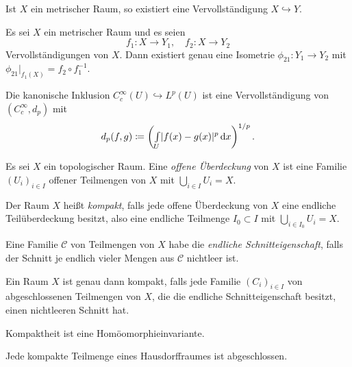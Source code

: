 \documentclass{cheat-sheet}
\begin{document}
\begin{satz}
  Ist $X$ ein metrischer Raum, so existiert eine Vervollständigung $X \hookrightarrow Y$.
\end{satz}

\begin{prop}
  Es sei $X$ ein metrischer Raum und es seien
  \[ f_1 : X \to Y_1, \quad f_2 : X \to Y_2 \]
  Vervollständigungen von $X$. Dann existiert genau eine Isometrie $\phi_{21} : Y_1 \to Y_2$ mit $\phi_{21}|_{f_1(X)} = f_2 \circ f_1^{-1}$.
\end{prop}

\begin{bsp}
  Die kanonische Inklusion $C_c^{\infty}(U) \hookrightarrow L^p(U)$ ist eine Vervollständigung von $(C_c^{\infty}, d_p)$ mit
  \[ d_p(f, g) \coloneqq \left( {\textstyle \int\limits_{U}^{}} \lvert f(x) - g(x)\rvert^p \,\mathrm{d} x \right)^{1/p}. \]
\end{bsp}

\begin{defn}
  Es sei $X$ ein topologischer Raum. Eine \emph{offene Überdeckung} von $X$ ist eine Familie $(U_i)_{i \in I}$ offener Teilmengen von $X$ mit $\bigcup_{i \in I} U_i = X$.
\end{defn}

\begin{defn}
  Der Raum $X$ heißt \emph{kompakt}, falls jede offene Überdeckung von $X$ eine endliche Teilüberdeckung besitzt, also eine endliche Teilmenge $I_0 \subset I$ mit $\bigcup_{i \in I_0} U_i = X$.
\end{defn}

\begin{defn}
  Eine Familie $\mathcal{C}$ von Teilmengen von $X$ habe die \emph{endliche Schnitteigenschaft}, falls der Schnitt je endlich vieler Mengen aus $\mathcal{C}$ nichtleer ist.
\end{defn}

\begin{prop}
  Ein Raum $X$ ist genau dann kompakt, falls jede Familie $(C_i)_{i \in I}$ von abgeschlossenen Teilmengen von $X$, die die endliche Schnitteigenschaft besitzt, einen nichtleeren Schnitt hat. %
\end{prop}

\begin{bem}
  Kompaktheit ist eine Homöomorphieinvariante.
\end{bem}

\begin{prop}
  Jede kompakte Teilmenge eines Hausdorffraumes ist abgeschlossen.
\end{prop}
\end{document}
